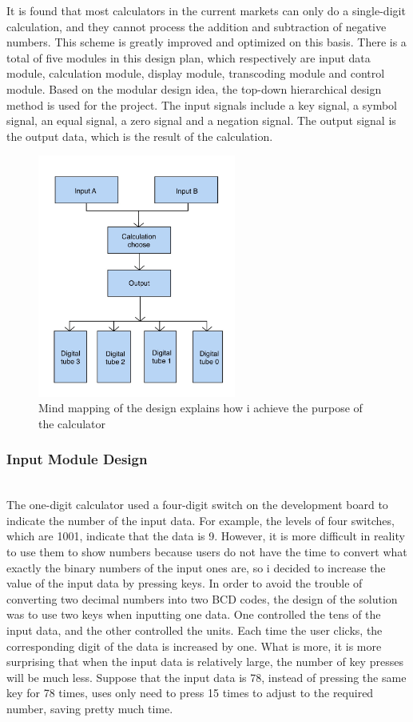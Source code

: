 \documentclass[11pt,journal,compsoc]{IEEEtran}
\begin{document}
It is found that most calculators in the current markets can only do a single-digit calculation, and they cannot process the addition and subtraction of negative numbers. This scheme is greatly improved and optimized on this basis. There is a total of five modules in this design plan, which respectively are input data module, calculation module, display module, transcoding module and control module. Based on the modular design idea, the top-down hierarchical design method is used for the project. The input signals include a key signal, a symbol signal, an equal signal, a zero signal and a negation signal. The output signal is the output data, which is the result of the calculation.
\begin{figure}[H]
	\centering
	\includegraphics[width=6.5cm]{fig3}
	\caption{Mind mapping of the design explains how i achieve the purpose of the calculator}
	\label{Fig3}
\end{figure}
\subsubsection{Input Module Design}
\hfill\\
The one-digit calculator used a four-digit switch on the development board to indicate the number of the input data. For example, the levels of four switches, which are 1001, indicate that the data is 9. However, it is more difficult in reality to use them to show numbers because users do not have the time to convert what exactly the binary numbers of the input ones are, so i decided to increase the value of the input data by pressing keys. In order to avoid the trouble of converting two decimal numbers into two BCD codes, the design of the solution was to use two keys when inputting one data. One controlled the tens of the input data, and the other controlled the units. Each time the user clicks, the corresponding digit of the data is increased by one. What is more, it is more surprising that when the input data is relatively large, the number of key presses will be much less. Suppose that the input data is 78, instead of pressing the same key for 78 times, uses only need to press 15 times to adjust to the required number, saving pretty much time. 
\end{document}
